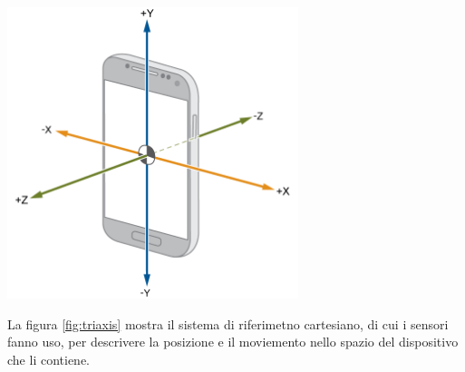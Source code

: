 \documentclass[a4paper, oneside]{book}
\begin{document}
\vspace{18mm}\vspace{18mm}
\begin{center}
\begin{minipage}{0.68\linewidth}
\begin{center}
\vspace{18mm}
\includegraphics[width=85mm]{./images/triaxial_sensor.png}
\vspace{3mm}
\label{fig:triaxis}
\end{center}
\end{minipage}
\end{center}
\vspace{4mm}
La figura \ref{fig:triaxis} mostra il sistema di riferimetno cartesiano, di cui i sensori fanno uso, per descrivere la posizione e il moviemento nello spazio del dispositivo che li contiene.

\clearpage


\end{document}

